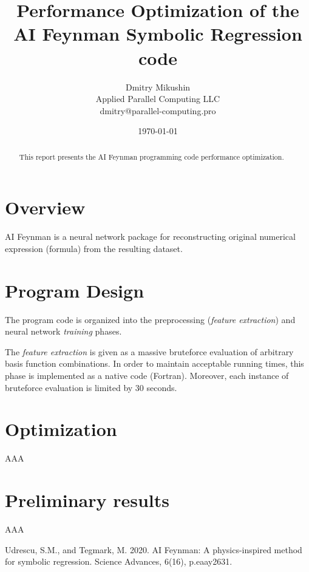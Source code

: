 \documentclass[peerreview]{IEEEtran}
\begin{document}
\setcounter{page}{1}

\title{Performance Optimization of the AI Feynman Symbolic Regression code}

\author{Dmitry Mikushin \\
Applied Parallel Computing LLC \\
dmitry@parallel-computing.pro \\
}
\date{\today}

\maketitle
\tableofcontents

\begin{abstract}
This report presents the AI Feynman programming code performance optimization.
\end{abstract}

\section{Overview}

AI Feynman \cite{aifeynman} is a neural network package for reconstructing original numerical expression (formula) from the resulting dataset.

\section{Program Design}

The program code is organized into the preprocessing (\emph{feature extraction}) and neural network \emph{training} phases.

The \emph{feature extraction} is given as a massive bruteforce evaluation of arbitrary basis function combinations. In order to maintain acceptable running times, this phase is implemented as a native code (Fortran). Moreover, each instance of bruteforce evaluation is limited by 30 seconds.

\section{Optimization}

AAA

\section{Preliminary results}

AAA

\begin{thebibliography}{1}
Udrescu, S.M., and Tegmark, M. 2020. AI Feynman: A physics-inspired method for symbolic regression. Science Advances, 6(16), p.eaay2631.
\end{thebibliography}
\end{document}
